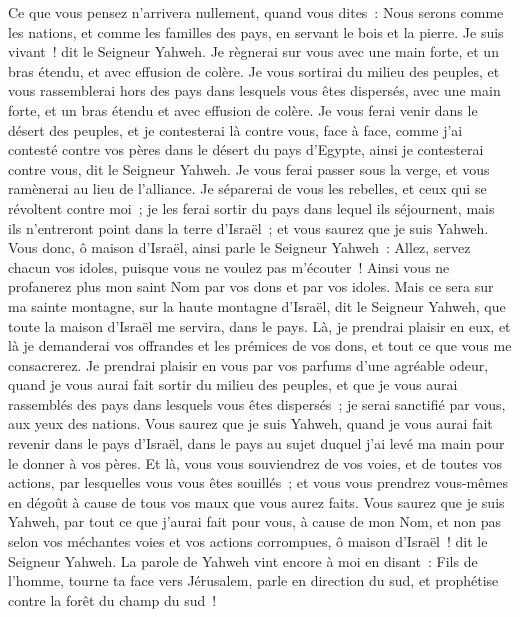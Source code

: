 \begin{multicols}{2}
Ce que vous pensez n'arrivera nullement, quand vous dites~: Nous serons comme les nations, et comme les familles des pays, en servant le bois et la pierre.
Je suis vivant~! dit le Seigneur Yahweh. Je règnerai sur vous avec une main forte, et un bras étendu, et avec effusion de colère.
Je vous sortirai du milieu des peuples, et vous rassemblerai hors des pays dans lesquels vous êtes dispersés, avec une main forte, et un bras étendu et avec effusion de colère.
Je vous ferai venir dans le désert des peuples, et je contesterai là contre vous, face à face,
comme j'ai contesté contre vos pères dans le désert du pays d'Egypte, ainsi je contesterai contre vous, dit le Seigneur Yahweh.
Je vous ferai passer sous la verge, et vous ramènerai au lieu de l'alliance.
Je séparerai de vous les rebelles, et ceux qui se révoltent contre moi~; je les ferai sortir du pays dans lequel ils séjournent, mais ils n'entreront point dans la terre d'Israël~; et vous saurez que je suis Yahweh.
Vous donc, ô maison d'Israël, ainsi parle le Seigneur Yahweh~: Allez, servez chacun vos idoles, puisque vous ne voulez pas m'écouter~! Ainsi vous ne profanerez plus mon saint Nom par vos dons et par vos idoles.
Mais ce sera sur ma sainte montagne, sur la haute montagne d'Israël, dit le Seigneur Yahweh, que toute la maison d'Israël me servira, dans le pays. Là, je prendrai plaisir en eux, et là je demanderai vos offrandes et les prémices de vos dons, et tout ce que vous me consacrerez.
Je prendrai plaisir en vous par vos parfums d'une agréable odeur, quand je vous aurai fait sortir du milieu des peuples, et que je vous aurai rassemblés des pays dans lesquels vous êtes dispersés~; je serai sanctifié par vous, aux yeux des nations.
Vous saurez que je suis Yahweh, quand je vous aurai fait revenir dans le pays d'Israël, dans le pays au sujet duquel j'ai levé ma main pour le donner à vos pères.
Et là, vous vous souviendrez de vos voies, et de toutes vos actions, par lesquelles vous vous êtes souillés~; et vous vous prendrez vous-mêmes en dégoût à cause de tous vos maux que vous aurez faits.
Vous saurez que je suis Yahweh, par tout ce que j'aurai fait pour vous, à cause de mon Nom, et non pas selon vos méchantes voies et vos actions corrompues, ô maison d'Israël~! dit le Seigneur Yahweh.
\VerseOne{}La parole de Yahweh vint encore à moi en disant~:
Fils de l'homme, tourne ta face vers Jérusalem, parle en direction du sud, et prophétise contre la forêt du champ du sud~!

\end{multicols}
